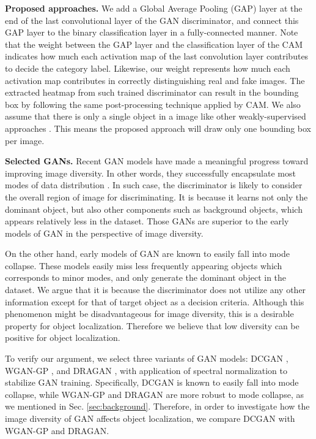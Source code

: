 \documentclass[runningheads]{llncs}
\begin{document}
\noindent\textbf{Proposed approaches.} We add a Global Average Pooling (GAP) layer at the end of the last convolutional layer of the GAN discriminator, and connect this GAP layer to the binary classification layer in a fully-connected manner. Note that the weight between the GAP layer and the classification layer of the CAM indicates how much each activation map of the last convolution layer contributes to decide the category label. Likewise, our weight represents how much each activation map contributes in correctly distinguishing real and fake images. The extracted heatmap from such trained discriminator can result in the bounding box by following the same post-processing technique applied by CAM. We also assume that there is only a single object in a image like other weakly-supervised approaches \cite{zhou2016learning,kim2017two,singh2017hide,choe2018improved}. This means the proposed approach will draw only one bounding box per image.



\noindent\textbf{Selected GANs.} Recent GAN models have made a meaningful progress toward improving image diversity. In other words, they successfully encapsulate most modes of data distribution \cite{arjovsky2017wasserstein,gulrajani2017improved,kodali2017dragan,fedus2017many}. In such case, the discriminator is likely to consider the overall region of image for discriminating. It is because it learns not only the dominant object, but also other components such as background objects, which appears relatively less in the dataset. Those GANs are superior to the early models of GAN in the perspective of image diversity.

On the other hand, early models of GAN are known to easily fall into mode collapse. These models easily miss less frequently appearing objects which corresponds to minor modes, and only generate the dominant object in the dataset. We argue that it is because the discriminator does not utilize any other information except for that of target object as a decision criteria. Although this phenomenon might be disadvantageous for image diversity, this is a desirable property for object localization. Therefore we believe that low diversity can be positive for object localization.

To verify our argument, we select three variants of GAN models: DCGAN \cite{radford2015unsupervised}, WGAN-GP \cite{gulrajani2017improved}, and DRAGAN \cite{kodali2017dragan}, with application of spectral normalization \cite{miyato2018spectral} to stabilize GAN training. Specifically, DCGAN is known to easily fall into mode collapse, while WGAN-GP \cite{arjovsky2017wasserstein} and DRAGAN \cite{kodali2017dragan} are more robust to mode collapse, as we mentioned in Sec. \ref{sec:background}. Therefore, in order to investigate how the image diversity of GAN affects object localization, we compare DCGAN with WGAN-GP and DRAGAN.
\end{document}
